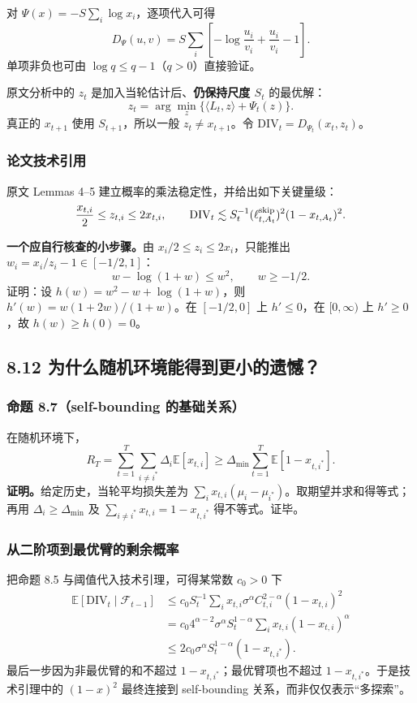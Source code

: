 对 $\Psi(x)=-S\sum_i\log x_i$，逐项代入可得
\[
D_\Psi(u,v)=S\sum_i\left[-\log\frac{u_i}{v_i}+\frac{u_i}{v_i}-1\right].
\]
单项非负也可由 $\log q\le q-1$（$q>0$）直接验证。

原文分析中的 $z_t$ 是加入当轮估计后、\textbf{仍保持尺度 $S_t$} 的最优解：
\[
z_t=\arg\min_z\{\langle L_t,z\rangle+\Psi_t(z)\}.
\]
真正的 $x_{t+1}$ 使用 $S_{t+1}$，所以一般 $z_t\ne x_{t+1}$。令 $\mathrm{DIV}_t=D_{\Psi_t}(x_t,z_t)$。

\subsubsection{论文技术引用}
原文 Lemmas 4--5 建立概率的乘法稳定性，并给出如下关键量级：
\[
\frac{x_{t,i}}2\le z_{t,i}\le2x_{t,i},\qquad
\mathrm{DIV}_t\lesssim S_t^{-1}(\ell^{\rm skip}_{t,A_t})^2(1-x_{t,A_t})^2.
\]

\textbf{一个应自行核查的小步骤。}由 $x_i/2\le z_i\le2x_i$，只能推出 $w_i=x_i/z_i-1\in[-1/2,1]$：
\[
w-\log(1+w)\le w^2,\qquad w\ge-1/2.
\]
证明：设 $h(w)=w^2-w+\log(1+w)$，则
$h'(w)=w(1+2w)/(1+w)$。在 $[-1/2,0]$ 上 $h'\le0$，在 $[0,\infty)$ 上 $h'\ge0$，故 $h(w)\ge h(0)=0$。

\subsection{8.12 为什么随机环境能得到更小的遗憾？}

\subsubsection{命题 8.7（self-bounding 的基础关系）}
在随机环境下，
\[
R_T=\sum_{t=1}^T\sum_{i\ne i^*}\Delta_i\mathbb E[x_{t,i}]
\ge\Delta_{\min}\sum_{t=1}^T\mathbb E[1-x_{t,i^*}].
\]
\textbf{证明。}给定历史，当轮平均损失差为 $\sum_i x_{t,i}(\mu_i-\mu_{i^*})$。取期望并求和得等式；再用 $\Delta_i\ge\Delta_{\min}$ 及 $\sum_{i\ne i^*}x_{t,i}=1-x_{t,i^*}$ 得不等式。证毕。

\subsubsection{从二阶项到最优臂的剩余概率}
把命题 8.5 与阈值代入技术引理，可得某常数 $c_0>0$ 下
\begin{align*}
\mathbb E[\mathrm{DIV}_t\mid\mathcal F_{t-1}]
&\le c_0S_t^{-1}\sum_i x_{t,i}\sigma^\alpha C_{t,i}^{2-\alpha}(1-x_{t,i})^2\\
&=c_0 4^{\alpha-2}\sigma^\alpha S_t^{1-\alpha}\sum_i x_{t,i}(1-x_{t,i})^\alpha\\
&\le 2c_0\sigma^\alpha S_t^{1-\alpha}(1-x_{t,i^*}).
\end{align*}
最后一步因为非最优臂的和不超过 $1-x_{t,i^*}$；最优臂项也不超过 $1-x_{t,i^*}$。于是技术引理中的 $(1-x)^2$ 最终连接到 self-bounding 关系，而非仅仅表示“多探索”。

